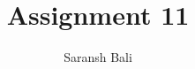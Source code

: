 \documentclass[journal,12pt,twocolumn]{IEEEtran}
\begin{document}
\makeatletter
{}
\makeatother
\let\StandardTheFigure\thefigure
\let\vec\mathbf
\renewcommand{\thefigure}{\theproblem}
\def\putbox#1#2#3{\makebox[0in][l]{\makebox[#1][l]{}\raisebox{\baselineskip}[0in][0in]{\raisebox{#2}[0in][0in]{#3}}}}
     \def\rightbox#1{\makebox[0in][r]{#1}}
     \def\centbox#1{\makebox[0in]{#1}}
     \def\topbox#1{\raisebox{-\baselineskip}[0in][0in]{#1}}
     \def\midbox#1{\raisebox{-0.5\baselineskip}[0in][0in]{#1}}
\vspace{3cm}
\title{Assignment 11}
\author{Saransh Bali}
%
%
%
% 
%
\end{document}
